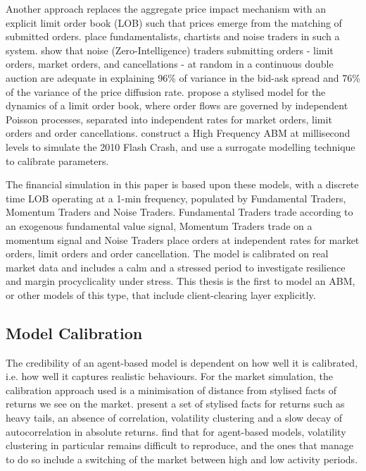 Another approach replaces the aggregate price impact mechanism with an explicit limit order book (LOB) such that prices emerge from the matching of submitted orders. \cite{chiarella_iori_perello_2009} place fundamentalists, chartists and noise traders in such a system. \cite{farmer_2005} show that noise (Zero-Intelligence) traders submitting orders - limit orders, market orders, and cancellations - at random in a continuous double auction are adequate in explaining 96\% of variance in the bid-ask spread and 76\% of the variance of the price diffusion rate. \cite{cont_stoikov_talreja_2008} propose a stylised model for the dynamics of a limit order book, where order flows are governed by independent Poisson processes, separated into independent rates for market orders, limit orders and order cancellations. \cite{gao_2022_hfabm} construct a High Frequency ABM at millisecond levels to simulate the 2010 Flash Crash, and use a surrogate modelling technique to calibrate parameters.

The financial simulation in this paper is based upon these models, with a discrete time LOB operating at a 1-min frequency, populated by Fundamental Traders, Momentum Traders and Noise Traders. Fundamental Traders trade according to an exogenous fundamental value signal, Momentum Traders trade on a momentum signal and Noise Traders place orders at independent rates for market orders, limit orders and order cancellation. The model is calibrated on real market data and includes a calm and a stressed period to investigate resilience and margin procyclicality under stress. This thesis is the first to model an ABM, or other models of this type, that include client-clearing layer explicitly. 



\subsection{Model Calibration}

The credibility of an agent-based model is dependent on how well it is calibrated, i.e. how well it captures realistic behaviours. For the market simulation, the calibration approach used is a minimisation of distance from stylised facts of returns we see on the market. \cite{cont_2001} present a set of stylised facts for returns such as heavy tails, an absence of correlation, volatility clustering and a slow decay of autocorrelation in absolute returns. \cite{cont_2007} find that for agent-based models, volatility clustering in particular remains difficult to reproduce, and the ones that manage to do so include a switching of the market between high and low activity periods. 

